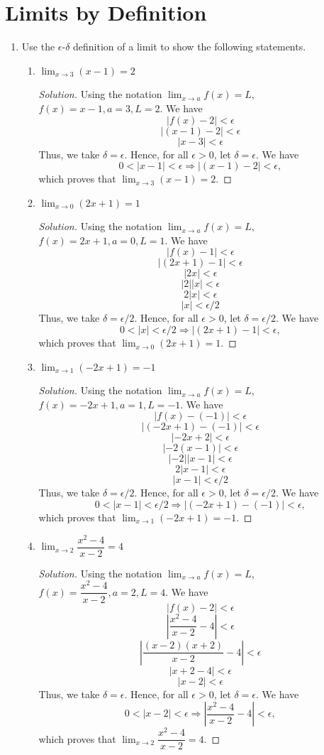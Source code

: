 \documentclass[12pt]{article}
\newenvironment{solution}{\begin{proof}[Solution]}{\end{proof}}
\begin{document}
	\section{Limits by Definition}
	
	\begin{enumerate}
		\item Use the $\epsilon$-$\delta$ definition of a limit to show the following statements.
		\begin{enumerate}
			\item $\displaystyle{\lim_{x \to 3} (x-1)}=2$
			\begin{solution}
				Using the notation $\displaystyle{\lim_{x \to a} f(x)}=L$, $f(x)=x-1, a=3, L=2$. We have 
				$$|f(x)-2|<\epsilon$$
				$$|(x-1)-2|<\epsilon$$
				$$|x-3|<\epsilon$$
			Thus, we take $\delta=\epsilon$. Hence, for all $\epsilon>0$, let $\delta=\epsilon$. We have
			$$0<|x-1|<\epsilon \Rightarrow |(x-1)-2|<\epsilon,$$ which proves that $\displaystyle{\lim_{x \to 3} (x-1)}=2$.
			\end{solution}
			\item $\displaystyle{\lim_{x \to 0} (2x+1)}=1$
			\begin{solution}
				Using the notation $\displaystyle{\lim_{x \to a} f(x)}=L$, $f(x)=2x+1, a=0, L=1$. We have 
				$$|f(x)-1|<\epsilon$$
				$$|(2x+1)-1|<\epsilon$$
				$$|2x|<\epsilon$$
				$$|2||x|<\epsilon$$
				$$2|x|<\epsilon$$
				$$|x|<\epsilon/2$$
				Thus, we take $\delta=\epsilon/2$. Hence, for all $\epsilon>0$, let $\delta=\epsilon/2$. We have
				$$0<|x|<\epsilon/2 \Rightarrow |(2x+1)-1|<\epsilon,$$ which proves that $\displaystyle{\lim_{x \to 0} (2x+1)}=1$.
			\end{solution}
			\item $\displaystyle{\lim_{x \to 1} (-2x+1)}=-1$
			\begin{solution}
				Using the notation $\displaystyle{\lim_{x \to a} f(x)}=L$, $f(x)=-2x+1, a=1, L=-1$. We have 
				$$|f(x)-(-1)|<\epsilon$$
				$$|(-2x+1)-(-1)|<\epsilon$$
				$$|-2x+2|<\epsilon$$
				$$|-2(x-1)|<\epsilon$$
				$$|-2||x-1|<\epsilon$$
				$$2|x-1|<\epsilon$$
				$$|x-1|<\epsilon/2$$
				Thus, we take $\delta=\epsilon/2$. Hence, for all $\epsilon>0$, let $\delta=\epsilon/2$. We have
				$$0<|x-1|<\epsilon/2 \Rightarrow |(-2x+1)-(-1)|<\epsilon,$$ which proves that $\displaystyle{\lim_{x \to 1} (-2x+1)}=-1$.
			\end{solution}
			\item $\displaystyle{\lim_{x \to 2} \dfrac{x^2-4}{x-2}}=4$
				\begin{solution}
				Using the notation $\displaystyle{\lim_{x \to a} f(x)}=L$, $f(x)=\dfrac{x^2-4}{x-2}, a=2, L=4$. We have 
				$$|f(x)-2|<\epsilon$$
				$$\left|\dfrac{x^2-4}{x-2}-4\right|<\epsilon$$
				$$\left|\dfrac{(x-2)(x+2)}{x-2}-4\right|<\epsilon$$
				$$|x+2-4|<\epsilon$$
				$$|x-2|<\epsilon$$
				Thus, we take $\delta=\epsilon$. Hence, for all $\epsilon>0$, let $\delta=\epsilon$. We have
				$$0<|x-2|<\epsilon \Rightarrow \left|\dfrac{x^2-4}{x-2}-4\right|<\epsilon,$$ which proves that $\displaystyle{\lim_{x \to 2} \dfrac{x^2-4}{x-2}}=4$.
			\end{solution}
		\end{enumerate}
		

\end{enumerate}
\end{document}

